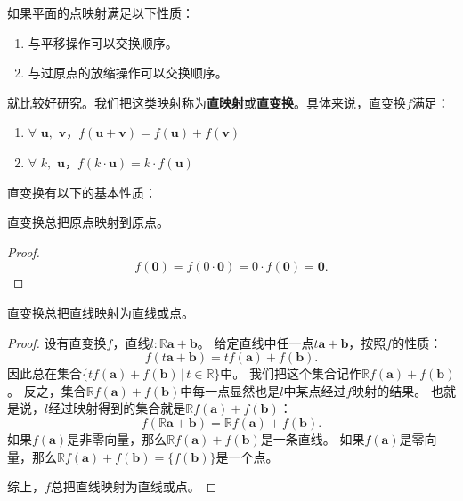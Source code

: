 \documentclass[12pt,UTF8,fontset=none]{ctexbook}
\begin{document}
如果平面的点映射满足以下性质：
\begin{enumerate}
    \item 与平移操作可以交换顺序。
    \item 与过原点的放缩操作可以交换顺序。
\end{enumerate}
就比较好研究。我们把这类映射称为\textbf{直映射}或\textbf{直变换}。具体来说，直变换$f$满足：
\begin{enumerate}
    \item $\forall \,\,\mathbf{u}, \,\,\mathbf{v}$，$f(\mathbf{u} + \mathbf{v}) = f(\mathbf{u}) + f(\mathbf{v})$
    \item $\forall \,\,k, \,\, \mathbf{u}$，$f(k\cdot \mathbf{u}) = k \cdot f(\mathbf{u})$
\end{enumerate}
直变换有以下的基本性质：
\begin{tm}
    直变换总把原点映射到原点。
\end{tm}
\begin{proof}
    $$f(\mathbf{0}) = f(0\cdot \mathbf{0}) = 0 \cdot f(\mathbf{0}) = \mathbf{0}.$$
\end{proof}
\begin{tm}
    直变换总把直线映射为直线或点。
\end{tm}
\begin{proof}
    设有直变换$f$，直线$l: \mathbb{R}\mathbf{a} + \mathbf{b}$。
    给定直线中任一点$t\mathbf{a} + \mathbf{b}$，按照$f$的性质：
    $$ f(t\mathbf{a} + \mathbf{b}) = tf(\mathbf{a}) + f(\mathbf{b}).$$
    因此总在集合$\{tf(\mathbf{a}) + f(\mathbf{b})\,|\, t\in\mathbb{R}\}$中。
    我们把这个集合记作$\mathbb{R}f(\mathbf{a}) + f(\mathbf{b})$。
    反之，集合$\mathbb{R}f(\mathbf{a}) + f(\mathbf{b})$中每一点显然也是$l$中某点经过$f$映射的结果。
    也就是说，$l$经过映射得到的集合就是$\mathbb{R}f(\mathbf{a}) + f(\mathbf{b})$：
    $$ f(\mathbb{R}\mathbf{a} + \mathbf{b}) = \mathbb{R}f(\mathbf{a}) + f(\mathbf{b}).$$
    如果$f(\mathbf{a})$是非零向量，那么$\mathbb{R}f(\mathbf{a}) + f(\mathbf{b})$是一条直线。
    如果$f(\mathbf{a})$是零向量，那么$\mathbb{R}f(\mathbf{a}) + f(\mathbf{b}) = \{f(\mathbf{b})\}$是一个点。

    综上，$f$总把直线映射为直线或点。
\end{proof}
\end{document}
